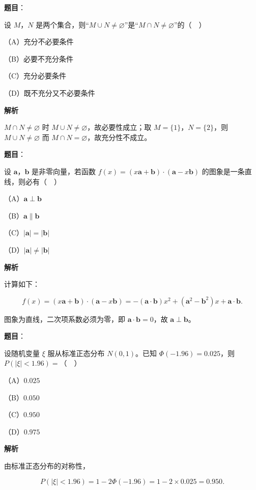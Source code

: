 \begin{answer}

\textbf{题目}：

设 $M$，$N$ 是两个集合，则“$M\cup N\neq\varnothing$”是“$M\cap N\neq\varnothing$”的（　）

（A）充分不必要条件

（B）必要不充分条件

（C）充分必要条件

（D）既不充分又不必要条件

\textbf{解析}

$M\cap N\neq\varnothing$ 时 $M\cup N\neq\varnothing$，故必要性成立；取 $M=\{1\}$，$N=\{2\}$，则 $M\cup N\neq\varnothing$ 而 $M\cap N=\varnothing$，故充分性不成立。


\end{answer}
\begin{answer}

\textbf{题目}：

设 $\boldsymbol a$，$\boldsymbol b$ 是非零向量，若函数 $f(x)=(x\boldsymbol a+\boldsymbol b)\cdot(\boldsymbol a-x\boldsymbol b)$ 的图象是一条直线，则必有（　）

（A）$\boldsymbol a\perp\boldsymbol b$

（B）$\boldsymbol a\parallel\boldsymbol b$

（C）$|\boldsymbol a|=|\boldsymbol b|$

（D）$|\boldsymbol a|\neq|\boldsymbol b|$

\textbf{解析}

计算如下：

\nopagebreak[4]
\[f(x)=(x\boldsymbol a+\boldsymbol b)\cdot(\boldsymbol a-x\boldsymbol b)
=-(\boldsymbol a\cdot\boldsymbol b)x^2+\left(\boldsymbol a^2-\boldsymbol b^2\right)x+\boldsymbol a\cdot\boldsymbol b.\]

图象为直线，二次项系数必须为零，即 $\boldsymbol a\cdot\boldsymbol b=0$，故 $\boldsymbol a\perp\boldsymbol b$。


\end{answer}
\begin{answer}

\textbf{题目}：

设随机变量 $\xi$ 服从标准正态分布 $N(0,1)$。已知 $\Phi(-1.96)=0.025$，则 $P(|\xi|<1.96)=$（　）

（A）$0.025$

（B）$0.050$

（C）$0.950$

（D）$0.975$

\textbf{解析}

由标准正态分布的对称性，

\nopagebreak[4]
\[P(|\xi|<1.96)=1-2\Phi(-1.96)=1-2\times0.025=0.950.\]


\end{answer}
